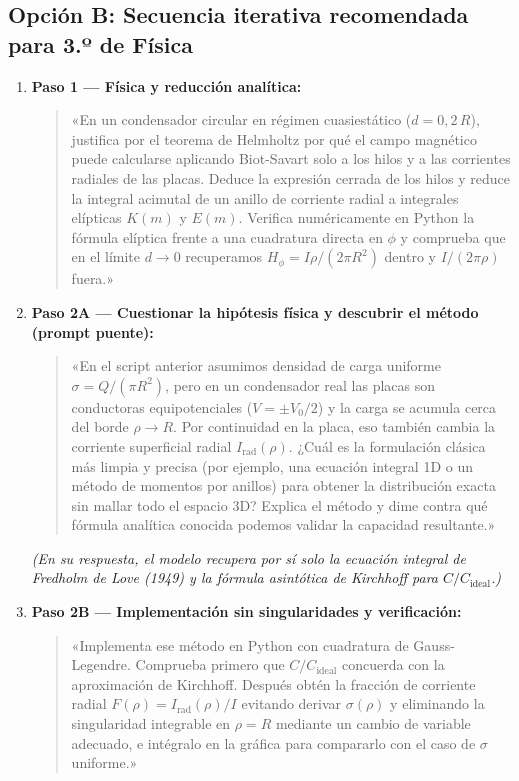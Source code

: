 \documentclass[11pt]{article}
\begin{document}
\subsection{Opción B: Secuencia iterativa recomendada para 3.º de Física}

\begin{enumerate}
    \item \textbf{Paso 1 --- Física y reducción analítica:}
    \begin{quote}
    «En un condensador circular en régimen cuasiestático ($d = 0{,}2\,R$), justifica por el teorema de Helmholtz por qué el campo magnético puede calcularse aplicando Biot-Savart solo a los hilos y a las corrientes radiales de las placas. Deduce la expresión cerrada de los hilos y reduce la integral acimutal de un anillo de corriente radial a integrales elípticas $K(m)$ y $E(m)$. Verifica numéricamente en Python la fórmula elíptica frente a una cuadratura directa en $\phi$ y comprueba que en el límite $d \to 0$ recuperamos $H_\phi = I\rho/(2\pi R^2)$ dentro y $I/(2\pi\rho)$ fuera.»
    \end{quote}

    \item \textbf{Paso 2A --- Cuestionar la hipótesis física y descubrir el método (prompt puente):}
    \begin{quote}
    «En el script anterior asumimos densidad de carga uniforme $\sigma = Q/(\pi R^2)$, pero en un condensador real las placas son conductoras equipotenciales ($V = \pm V_0/2$) y la carga se acumula cerca del borde $\rho \to R$. Por continuidad en la placa, eso también cambia la corriente superficial radial $I_{\mathrm{rad}}(\rho)$. ¿Cuál es la formulación clásica más limpia y precisa (por ejemplo, una ecuación integral 1D o un método de momentos por anillos) para obtener la distribución exacta sin mallar todo el espacio 3D? Explica el método y dime contra qué fórmula analítica conocida podemos validar la capacidad resultante.»
    \end{quote}
    \textit{\small\color{mutedgray}(En su respuesta, el modelo recupera por sí solo la ecuación integral de Fredholm de Love (1949) y la fórmula asintótica de Kirchhoff para $C/C_{\mathrm{ideal}}$.)}

    \item \textbf{Paso 2B --- Implementación sin singularidades y verificación:}
    \begin{quote}
    «Implementa ese método en Python con cuadratura de Gauss-Legendre. Comprueba primero que $C/C_{\mathrm{ideal}}$ concuerda con la aproximación de Kirchhoff. Después obtén la fracción de corriente radial $F(\rho) = I_{\mathrm{rad}}(\rho)/I$ evitando derivar $\sigma(\rho)$ y eliminando la singularidad integrable en $\rho = R$ mediante un cambio de variable adecuado, e intégralo en la gráfica para compararlo con el caso de $\sigma$ uniforme.»
    \end{quote}


\end{enumerate}
\end{document}
